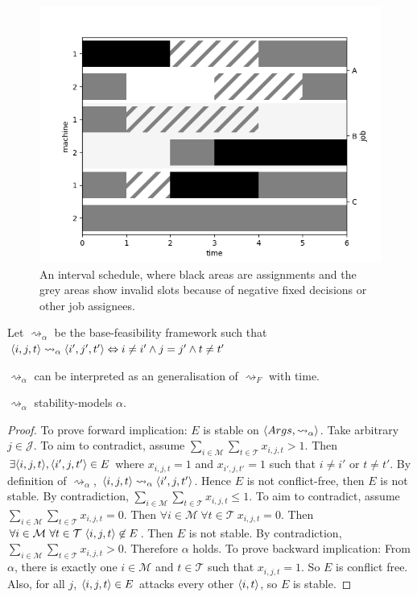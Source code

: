 \begin{figure}[H]
	\begin{center}
		\includegraphics[width=.8\linewidth]{figures/interval.png}	
	\end{center}
	\caption{An interval schedule, where black areas are assignments and the grey areas show invalid slots because of negative fixed decisions or other job assignees.}
\end{figure}

\begin{definition}
	\label{intervalalpha}
	
	Let $\rightsquigarrow_\alpha$ be the base-feasibility framework such that $\langle{i},{j},{t}\rangle\rightsquigarrow_\alpha\langle{i'},{j'},{t'}\rangle\Leftrightarrow i\neq i'\land j=j'\land t\neq t'$ 
\end{definition}

$\rightsquigarrow_\alpha$ can be interpreted as an generalisation of $\rightsquigarrow_F$ with time.

\begin{lemma}
	\label{stabilityalpha}
	$\rightsquigarrow_\alpha$ stability-models $\alpha$.
	
	\begin{proof}
		To prove forward implication: $E$ is stable on $\langle{Args},{\rightsquigarrow_\alpha}\rangle$. Take arbitrary $j\in\mathcal{J}$. To aim to contradict, assume $\sum_{i\in\mathcal{M}}\sum_{t\in\mathcal{T}}x_{i,j,t}>1$. Then $\exists\langle{i},{j},{t}\rangle,\langle{i'},{j},{t'}\rangle\in E$ where $x_{i,j,t}=1$ and $x_{i',j,t'}=1$ such that $i\neq i'$ or $t\neq t'$. By definition of $\rightsquigarrow_\alpha$, $\langle{i},{j},{t}\rangle\rightsquigarrow_\alpha\langle{i'},{j},{t'}\rangle$. Hence $E$ is not conflict-free, then $E$ is not stable. By contradiction, $\sum_{i\in\mathcal{M}}\sum_{t\in\mathcal{T}}x_{i,j,t}\leq 1$. To aim to contradict, assume $\sum_{i\in\mathcal{M}}\sum_{t\in\mathcal{T}}x_{i,j,t}=0$. Then $\forall i\in\mathcal{M}\ \forall t\in\mathcal{T}\ x_{i,j,t}=0$. Then $\forall i\in\mathcal{M}\ \forall t\in\mathcal{T}\ \langle{i},{j},{t}\rangle\not\in E$. Then $E$ is not stable. By contradiction, $\sum_{i\in\mathcal{M}}\sum_{t\in\mathcal{T}}x_{i,j,t}>0$. Therefore $\alpha$ holds.
		\linespace
		To prove backward implication: From $\alpha$, there is exactly one $i\in\mathcal{M}$ and $t\in\mathcal{T}$ such that $x_{i,j,t}=1$. So $E$ is conflict free. Also, for all $j$, $\langle{i},{j},{t}\rangle\in E$ attacks every other $\langle{i},{t}\rangle$, so $E$ is stable.
	\end{proof}
\end{lemma}

